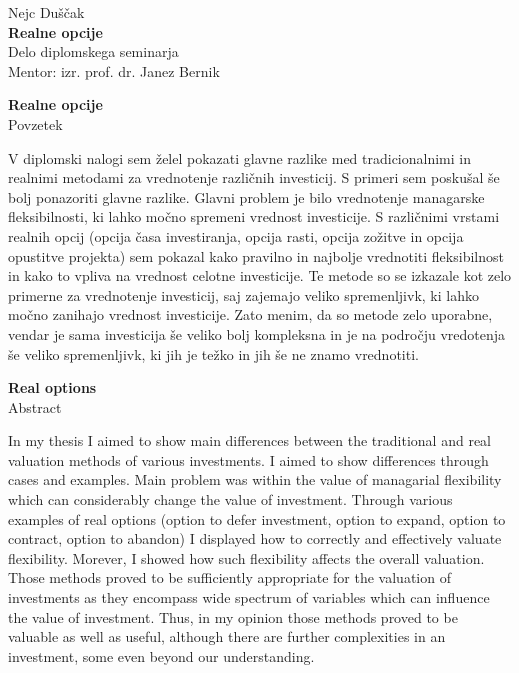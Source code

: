 \documentclass[12pt, a4paper]{amsart}
\theoremstyle{definition} %
\theoremstyle{plain} %
\newcommand{\imeavtorja}{Nejc Duščak}
\newcommand{\imementorja}{izr. prof. dr. Janez Bernik}
\newcommand{\naslovdela}{Realne opcije}
\newcommand{\letnica}{2021}
\begin{document}
 
\raggedbottom
\thispagestyle{empty}
\vfill

\begin{center}{\large
\imeavtorja\\[2mm]
{\bf \naslovdela}\\[10mm]
Delo diplomskega seminarja\\[1cm]
Mentor: \imementorja}
\end{center}
\vfill

\noindent{\large
Ljubljana, \letnica}
\pagebreak

\thispagestyle{empty}
\tableofcontents
\listoffigures
\listoftables
\pagebreak

\thispagestyle{empty}
\begin{center}
{\bf \naslovdela}\\[3mm]
{\sc Povzetek}
\end{center}
V diplomski nalogi sem želel pokazati glavne razlike med tradicionalnimi in realnimi metodami za vrednotenje različnih investicij. S primeri sem poskušal še bolj ponazoriti glavne razlike. Glavni problem je bilo vrednotenje managarske fleksibilnosti, ki lahko močno spremeni vrednost investicije. S različnimi vrstami realnih opcij (opcija časa investiranja, opcija rasti, opcija zožitve in opcija opustitve projekta) sem pokazal kako pravilno in najbolje vrednotiti fleksibilnost in kako to vpliva na vrednost celotne investicije. Te metode so se izkazale kot zelo primerne za vrednotenje investicij, saj zajemajo veliko spremenljivk, ki lahko močno zanihajo vrednost investicije. Zato menim, da so metode zelo uporabne, vendar je sama investicija še veliko bolj kompleksna in je na področju vredotenja še veliko spremenljivk, ki jih je težko in jih še ne znamo vrednotiti.
\vfill
\begin{center}
{\bf Real options}\\[3mm] 
{\sc Abstract}
\end{center}
In my thesis I aimed to show  main differences between the traditional and real valuation methods of various investments. I aimed to show differences through cases and examples. Main problem was within the value of managarial flexibility which can considerably change the value of investment. Through various examples of real options (option to defer investment, option to expand, option to contract, option to abandon) I displayed how to correctly and effectively valuate flexibility. Morever, I showed how such flexibility affects the overall valuation. Those methods proved to be sufficiently appropriate for the valuation of investments as they encompass wide spectrum of variables which can influence the value of investment. Thus, in my opinion those methods proved to be valuable as well as useful, although there are further complexities in an investment, some even  beyond our understanding.
\end{document}
